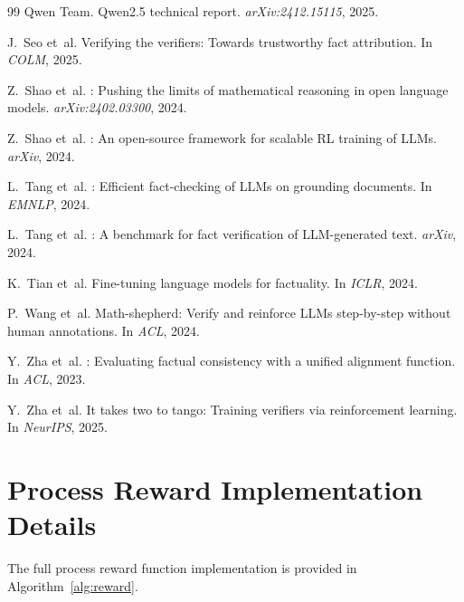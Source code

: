 \documentclass{article}
\begin{document}
\begin{thebibliography}{99}
Qwen Team.
\newblock Qwen2.5 technical report.
\newblock \emph{arXiv:2412.15115}, 2025.

J.~Seo et~al.
\newblock Verifying the verifiers: Towards trustworthy fact attribution.
\newblock In \emph{COLM}, 2025.

Z.~Shao et~al.
: Pushing the limits of mathematical reasoning in open language models.
\newblock \emph{arXiv:2402.03300}, 2024.

Z.~Shao et~al.
: An open-source framework for scalable RL training of LLMs.
\newblock \emph{arXiv}, 2024.

L.~Tang et~al.
: Efficient fact-checking of {LLMs} on grounding documents.
\newblock In \emph{EMNLP}, 2024.

L.~Tang et~al.
: A benchmark for fact verification of {LLM}-generated text.
\newblock \emph{arXiv}, 2024.

K.~Tian et~al.
\newblock Fine-tuning language models for factuality.
\newblock In \emph{ICLR}, 2024.

P.~Wang et~al.
\newblock Math-shepherd: Verify and reinforce {LLMs} step-by-step without human annotations.
\newblock In \emph{ACL}, 2024.

Y.~Zha et~al.
: Evaluating factual consistency with a unified alignment function.
\newblock In \emph{ACL}, 2023.

Y.~Zha et~al.
\newblock It takes two to tango: Training verifiers via reinforcement learning.
\newblock In \emph{NeurIPS}, 2025.

\end{thebibliography}


\appendix
\section{Process Reward Implementation Details}
\label{app:reward}

The full process reward function implementation is provided in Algorithm~\ref{alg:reward}.
\end{document}
